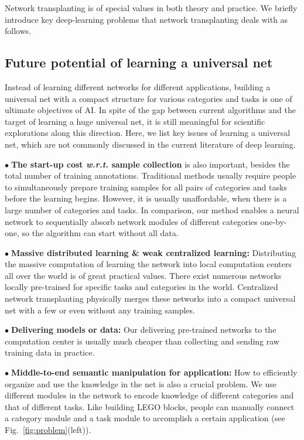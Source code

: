 \documentclass[10pt,twocolumn,letterpaper]{article}
\begin{document}
Network transplanting is of special values in both theory and practice. We briefly introduce key deep-learning problems that network transplanting deals with as follows.

\subsection{Future potential of learning a universal net}
\label{sec:universal}

Instead of learning different networks for different applications, building a universal net with a compact structure for various categories and tasks is one of ultimate objectives of AI. In spite of the gap between current algorithms and the target of learning a huge universal net, it is still meaningful for scientific explorations along this direction. Here, we list key issues of learning a universal net, which are not commonly discussed in the current literature of deep learning.

\noindent
$\bullet\;$\textbf{The start-up cost \emph{w.r.t.} sample collection} is also important, besides the total number of training annotations. Traditional methods usually require people to simultaneously prepare training samples for all pairs of categories and tasks before the learning begins. However, it is usually unaffordable, when there is a large number of categories and tasks. In comparison, our method enables a neural network to sequentially absorb network modules of different categories one-by-one, so the algorithm can start without all data.

\noindent
$\bullet\;$\textbf{Massive distributed learning \& weak centralized learning:} Distributing the massive computation of learning the network into local computation centers all over the world is of great practical values. There exist numerous networks locally pre-trained for specific tasks and categories in the world. Centralized network transplanting physically merges these networks into a compact universal net with a few or even without any training samples.

\noindent
$\bullet\;$\textbf{Delivering models or data:} Our delivering pre-trained networks to the computation center is usually much cheaper than collecting and sending raw training data in practice.

\noindent
$\bullet\;$\textbf{Middle-to-end semantic manipulation for application:} How to efficiently organize and use the knowledge in the net is also a crucial problem. We use different modules in the network to encode knowledge of different categories and that of different tasks. Like building LEGO blocks, people can manually connect a category module and a task module to accomplish a certain application (see Fig.~\ref{fig:problem}(left)).
\end{document}

